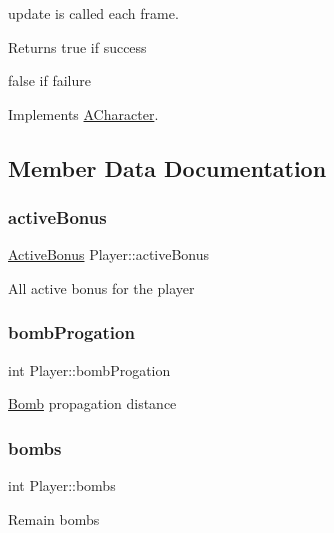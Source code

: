 update is called each frame. 

\begin{DoxyReturn}{Returns}
true if success 

false if failure 
\end{DoxyReturn}


Implements \hyperlink{class_a_character_af5a4d00f6104d45b821a2e88b80936b5}{A\+Character}.



\subsection{Member Data Documentation}
\mbox{\label{class_player_ab8221d150947cc7ff0a87bc44a3cb431}} 
\subsubsection{\texorpdfstring{active\+Bonus}{activeBonus}}
{\footnotesize\ttfamily \hyperlink{struct_player_1_1_active_bonus}{Active\+Bonus} Player\+::active\+Bonus}

All active bonus for the player \mbox{\label{class_player_a51ec1da9050f53921825a472b39b9977}} 
\subsubsection{\texorpdfstring{bomb\+Progation}{bombProgation}}
{\footnotesize\ttfamily int Player\+::bomb\+Progation}

\hyperlink{class_bomb}{Bomb} propagation distance \mbox{\label{class_player_a948d5a3b282419b995dcc32f66bf6b54}} 
\subsubsection{\texorpdfstring{bombs}{bombs}}
{\footnotesize\ttfamily int Player\+::bombs}

Remain bombs \mbox{\label{class_player_a2dfa1c51a817ec617e0dc0191481d4a8}} 
